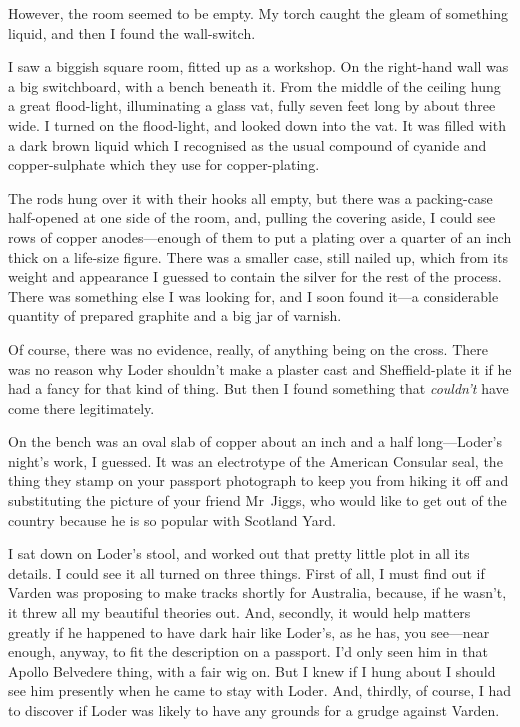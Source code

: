 However, the room seemed to be empty. My torch caught the gleam of something liquid, and then I found the wall-switch.

I saw a biggish square room, fitted up as a workshop. On the right-hand wall was a big switchboard, with a bench beneath it. From the middle of the ceiling hung a great flood-light, illuminating a glass vat, fully seven feet long by about three wide. I turned on the flood-light, and looked down into the vat. It was filled with a dark brown liquid which I recognised as the usual compound of cyanide and copper-sulphate which they use for copper-plating.

The rods hung over it with their hooks all empty, but there was a packing-case half-opened at one side of the room, and, pulling the covering aside, I could see rows of copper anodes—enough of them to put a plating over a quarter of an inch thick on a life-size figure. There was a smaller case, still nailed up, which from its weight and appearance I guessed to contain the silver for the rest of the process. There was something else I was looking for, and I soon found it—a considerable quantity of prepared graphite and a big jar of varnish.

Of course, there was no evidence, really, of anything being on the cross. There was no reason why Loder shouldn't make a plaster cast and Sheffield-plate it if he had a fancy for that kind of thing. But then I found something that \textit{couldn't} have come there legitimately.

On the bench was an oval slab of copper about an inch and a half long—Loder's night's work, I guessed. It was an electrotype of the American Consular seal, the thing they stamp on your passport photograph to keep you from hiking it off and substituting the picture of your friend Mr~Jiggs, who would like to get out of the country because he is so popular with Scotland Yard.

I sat down on Loder's stool, and worked out that pretty little plot in all its details. I could see it all turned on three things. First of all, I must find out if Varden was proposing to make tracks shortly for Australia, because, if he wasn't, it threw all my beautiful theories out. And, secondly, it would help matters greatly if he happened to have dark hair like Loder's, as he has, you see—near enough, anyway, to fit the description on a passport. I'd only seen him in that Apollo Belvedere thing, with a fair wig on. But I knew if I hung about I should see him presently when he came to stay with Loder. And, thirdly, of course, I had to discover if Loder was likely to have any grounds for a grudge against Varden.

